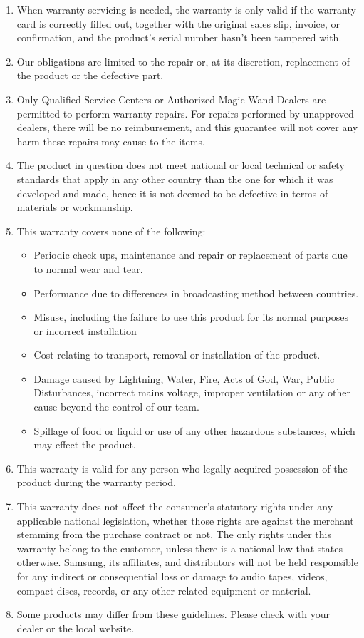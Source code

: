 \begin{enumerate}
	\item When warranty servicing is needed, the warranty is only valid if the warranty card is correctly filled out, together with the original sales slip, invoice, or confirmation, and the product's serial number hasn't been tampered with.
	\item Our obligations are limited to the repair or, at its discretion, replacement of the product or the defective part.
	\item Only Qualified Service Centers or Authorized Magic Wand Dealers are permitted to perform warranty repairs. For repairs performed by unapproved dealers, there will be no reimbursement, and this guarantee will not cover any harm these repairs may cause to the items.
	\item The product in question does not meet national or local technical or safety standards that apply in any other country than the one for which it was developed and made, hence it is not deemed to be defective in terms of materials or workmanship.
	\item This warranty covers none of the following:
	\begin{itemize}
		\item Periodic check ups, maintenance and repair or replacement of parts due to normal wear and tear.
			\item Performance due to differences in broadcasting method between countries.
			\item Misuse, including the failure to use this product for its normal purposes or incorrect installation
		\item Cost relating to transport, removal or installation of the product.
		\item Damage caused by Lightning, Water, Fire, Acts of God, War, Public Disturbances, incorrect mains voltage, improper ventilation or any other cause beyond the control of our team.
		\item Spillage of food or liquid or use of any other hazardous substances, which may effect the product.
	
	\end{itemize}
	\item This warranty is valid for any person who legally acquired possession of the product during the warranty period.
	\item This warranty does not affect the consumer's statutory rights under any applicable national legislation, whether those rights are against the merchant stemming from the purchase contract or not. The only rights under this warranty belong to the customer, unless there is a national law that states otherwise. Samsung, its affiliates, and distributors will not be held responsible for any indirect or consequential loss or damage to audio tapes, videos, compact discs, records, or any other related equipment or material.
	\item Some products may differ from these guidelines. Please check with your dealer or the local website. 
\end{enumerate}